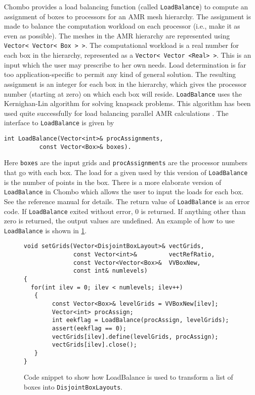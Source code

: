 Chombo provides a load balancing function         
(called {\tt LoadBalance}) to compute an assignment
of boxes to processors for an AMR mesh hierarchy.  
The assignment is made  to balance the computation
workload on each processor (i.e., make it as even as possible).
The meshes in the AMR hierarchy are represented using
\verb/Vector< Vector< Box > >/.
The computational workload is a real number for each box in the
hierarchy,  represented as a \verb/Vector< Vector <Real> >/.
This is an input which the user may prescribe to her own needs.
Load determination is far too application-specific 
to permit any kind of general solution.
The resulting assignment is an integer for each box in the hierarchy,
which gives the processor number (starting at zero) on which each box
will reside.  
{\tt LoadBalance} uses the Kernighan-Lin algorithm for
solving knapsack problems.  This algorithm has been used
quite successfully for load balancing parallel AMR calculations
\cite{Crutchfield91}. 
The interface to {\tt LoadBalance} is given by
\small \begin{verbatim}
int LoadBalance(Vector<int>& procAssignments, 
          const Vector<Box>& boxes).
\end{verbatim} \normalsize
Here {\tt boxes} are the input grids and
{\tt procAssignments} are the processor numbers
that go with each box.
The load for a given 
used by this version of {\tt LoadBalance} is the
number of points in the box.  There is a more elaborate
version of {\tt LoadBalance} in Chombo which allows
the user to input the loads for each box.  See the
reference manual for details.
The return value of {\tt LoadBalance} is an error code.  
If {\tt LoadBalance} exited without error, 0 is returned.
If anything other than zero is returned, the output values are
undefined. An example of how to use {\tt LoadBalance} is shown in
\ref{loadbalancefig}.
\begin{small}
\begin{figure}
\begin{verbatim}
void setGrids(Vector<DisjointBoxLayout>& vectGrids,
              const Vector<int>&         vectRefRatio, 
              const Vector<Vector<Box>&  VVBoxNew,
              const int& numlevels)
{
  for(int ilev = 0; ilev < numlevels; ilev++)
   {    
        const Vector<Box>& levelGrids = VVBoxNew[ilev];
        Vector<int> procAssign;
        int eekflag = LoadBalance(procAssign, levelGrids);
        assert(eekflag == 0);
        vectGrids[ilev].define(levelGrids, procAssign);
        vectGrids[ilev].close();
   }
}
\end{verbatim}
\hrulefill
\caption{Code snippet to show how LoadBalance is used to 
        transform a list of boxes into {\tt DisjointBoxLayouts}.}
\label{loadbalancefig}
\end{figure}
\end{small}

